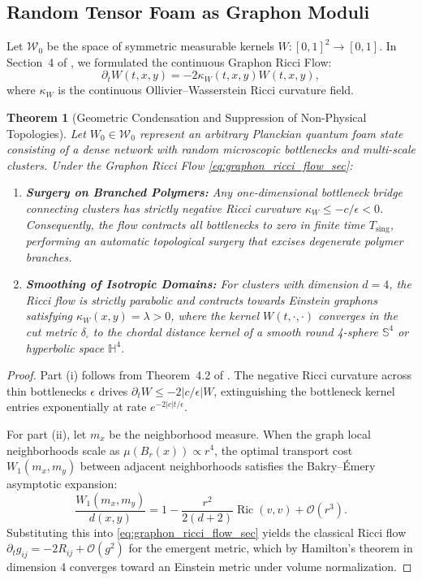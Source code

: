 \documentclass[11pt,a4paper,reqno]{amsart}
\newtheorem{theorem}{Theorem}[section]
\theoremstyle{definition}
\numberwithin{equation}{section}
\providecommand{\Sph}{\mathbb{S}}
\newcommand{\Ric}{\operatorname{Ric}}
\begin{document}
\subsection{Random Tensor Foam as Graphon Moduli}
Let $\mathcal{W}_0$ be the space of symmetric measurable kernels $W \colon [0, 1]^2 \to [0, 1]$. In Section~4 of \cite{silvafilho2026flows}, we formulated the continuous Graphon Ricci Flow:
\begin{equation}
    \label{eq:graphon_ricci_flow_sec}
    \partial_t W(t, x, y) = -2 \kappa_W(t, x, y) W(t, x, y),
\end{equation}
where $\kappa_W$ is the continuous Ollivier--Wasserstein Ricci curvature field.

\begin{theorem}[Geometric Condensation and Suppression of Non-Physical Topologies]
\label{thm:geometric_condensation}
Let $W_0 \in \mathcal{W}_0$ represent an arbitrary Planckian quantum foam state consisting of a dense network with random microscopic bottlenecks and multi-scale clusters. Under the Graphon Ricci Flow \eqref{eq:graphon_ricci_flow_sec}:
\begin{enumerate}[label=(\roman*)]
    \item \textbf{Surgery on Branched Polymers:} Any one-dimensional bottleneck bridge connecting clusters has strictly negative Ricci curvature $\kappa_W \le -c/\epsilon < 0$. Consequently, the flow contracts all bottlenecks to zero in finite time $T_{\mathrm{sing}}$, performing an automatic topological surgery that excises degenerate polymer branches.
    \item \textbf{Smoothing of Isotropic Domains:} For clusters with dimension $d = 4$, the Ricci flow is strictly parabolic and contracts towards Einstein graphons satisfying $\kappa_W(x, y) = \lambda > 0$, where the kernel $W(t, \cdot, \cdot)$ converges in the cut metric $\delta_\square$ to the chordal distance kernel of a smooth round 4-sphere $\Sph^4$ or hyperbolic space $\mathbb{H}^4$.
\end{enumerate}
\end{theorem}
\begin{proof}
Part (i) follows from Theorem~4.2 of \cite{silvafilho2026flows}. The negative Ricci curvature across thin bottlenecks $\epsilon$ drives $\partial_t W \le -2 |c/\epsilon| W$, extinguishing the bottleneck kernel entries exponentially at rate $e^{-2 |c| t / \epsilon}$. 

For part (ii), let $m_x$ be the neighborhood measure. When the graph local neighborhoods scale as $\mu(B_r(x)) \propto r^4$, the optimal transport cost $W_1(m_x, m_y)$ between adjacent neighborhoods satisfies the Bakry--\'Emery asymptotic expansion:
\begin{equation}
    \frac{W_1(m_x, m_y)}{d(x, y)} = 1 - \frac{r^2}{2(d+2)} \Ric(v, v) + \mathcal{O}(r^3).
\end{equation}
Substituting this into \eqref{eq:graphon_ricci_flow_sec} yields the classical Ricci flow $\partial_t g_{ij} = -2 R_{ij} + \mathcal{O}(g^2)$ for the emergent metric, which by Hamilton's theorem in dimension 4 converges toward an Einstein metric under volume normalization.
\end{proof}
\end{document}
